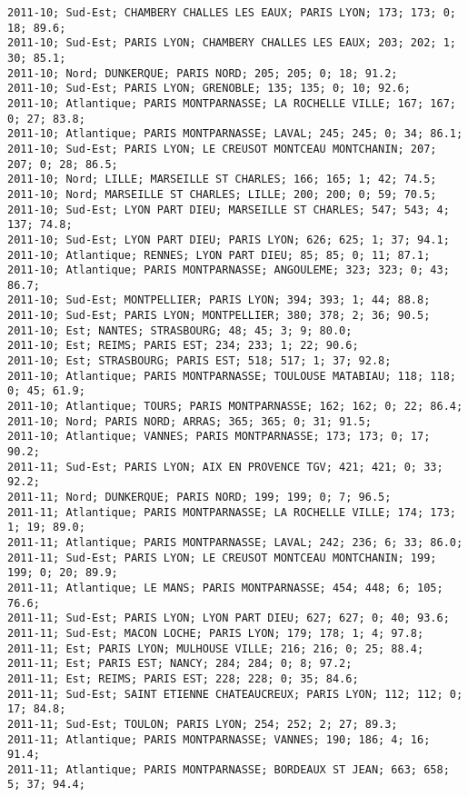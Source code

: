 \documentclass{article}
\begin{document}
\begin{Verbatim}[commandchars=\\\{\}]
2011-10; Sud-Est; CHAMBERY CHALLES LES EAUX; PARIS LYON; 173; 173; 0; 18; 89.6; 
2011-10; Sud-Est; PARIS LYON; CHAMBERY CHALLES LES EAUX; 203; 202; 1; 30; 85.1; 
2011-10; Nord; DUNKERQUE; PARIS NORD; 205; 205; 0; 18; 91.2; 
2011-10; Sud-Est; PARIS LYON; GRENOBLE; 135; 135; 0; 10; 92.6; 
2011-10; Atlantique; PARIS MONTPARNASSE; LA ROCHELLE VILLE; 167; 167; 0; 27; 83.8; 
2011-10; Atlantique; PARIS MONTPARNASSE; LAVAL; 245; 245; 0; 34; 86.1; 
2011-10; Sud-Est; PARIS LYON; LE CREUSOT MONTCEAU MONTCHANIN; 207; 207; 0; 28; 86.5; 
2011-10; Nord; LILLE; MARSEILLE ST CHARLES; 166; 165; 1; 42; 74.5; 
2011-10; Nord; MARSEILLE ST CHARLES; LILLE; 200; 200; 0; 59; 70.5; 
2011-10; Sud-Est; LYON PART DIEU; MARSEILLE ST CHARLES; 547; 543; 4; 137; 74.8; 
2011-10; Sud-Est; LYON PART DIEU; PARIS LYON; 626; 625; 1; 37; 94.1; 
2011-10; Atlantique; RENNES; LYON PART DIEU; 85; 85; 0; 11; 87.1; 
2011-10; Atlantique; PARIS MONTPARNASSE; ANGOULEME; 323; 323; 0; 43; 86.7; 
2011-10; Sud-Est; MONTPELLIER; PARIS LYON; 394; 393; 1; 44; 88.8; 
2011-10; Sud-Est; PARIS LYON; MONTPELLIER; 380; 378; 2; 36; 90.5; 
2011-10; Est; NANTES; STRASBOURG; 48; 45; 3; 9; 80.0; 
2011-10; Est; REIMS; PARIS EST; 234; 233; 1; 22; 90.6; 
2011-10; Est; STRASBOURG; PARIS EST; 518; 517; 1; 37; 92.8; 
2011-10; Atlantique; PARIS MONTPARNASSE; TOULOUSE MATABIAU; 118; 118; 0; 45; 61.9; 
2011-10; Atlantique; TOURS; PARIS MONTPARNASSE; 162; 162; 0; 22; 86.4; 
2011-10; Nord; PARIS NORD; ARRAS; 365; 365; 0; 31; 91.5; 
2011-10; Atlantique; VANNES; PARIS MONTPARNASSE; 173; 173; 0; 17; 90.2; 
2011-11; Sud-Est; PARIS LYON; AIX EN PROVENCE TGV; 421; 421; 0; 33; 92.2; 
2011-11; Nord; DUNKERQUE; PARIS NORD; 199; 199; 0; 7; 96.5; 
2011-11; Atlantique; PARIS MONTPARNASSE; LA ROCHELLE VILLE; 174; 173; 1; 19; 89.0; 
2011-11; Atlantique; PARIS MONTPARNASSE; LAVAL; 242; 236; 6; 33; 86.0; 
2011-11; Sud-Est; PARIS LYON; LE CREUSOT MONTCEAU MONTCHANIN; 199; 199; 0; 20; 89.9; 
2011-11; Atlantique; LE MANS; PARIS MONTPARNASSE; 454; 448; 6; 105; 76.6; 
2011-11; Sud-Est; PARIS LYON; LYON PART DIEU; 627; 627; 0; 40; 93.6; 
2011-11; Sud-Est; MACON LOCHE; PARIS LYON; 179; 178; 1; 4; 97.8; 
2011-11; Est; PARIS LYON; MULHOUSE VILLE; 216; 216; 0; 25; 88.4; 
2011-11; Est; PARIS EST; NANCY; 284; 284; 0; 8; 97.2; 
2011-11; Est; REIMS; PARIS EST; 228; 228; 0; 35; 84.6; 
2011-11; Sud-Est; SAINT ETIENNE CHATEAUCREUX; PARIS LYON; 112; 112; 0; 17; 84.8; 
2011-11; Sud-Est; TOULON; PARIS LYON; 254; 252; 2; 27; 89.3; 
2011-11; Atlantique; PARIS MONTPARNASSE; VANNES; 190; 186; 4; 16; 91.4; 
2011-11; Atlantique; PARIS MONTPARNASSE; BORDEAUX ST JEAN; 663; 658; 5; 37; 94.4; 

\end{Verbatim}
\end{document}
